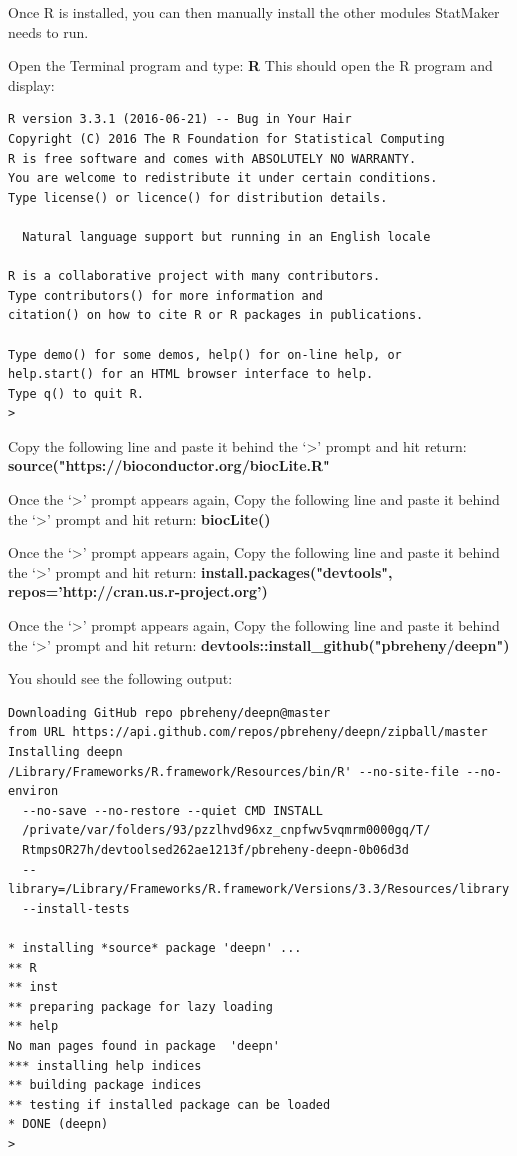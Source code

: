 \documentclass[11pt,fleqn]{book} %
\newcommand{\StatMaker}{{\color{Dandelion} StatMaker }}
\begin{document}
Once R is installed, you can then manually install the other modules \StatMaker needs to run.

Open the Terminal program and type:
 \textbf{R}
This should open the R program and display:


\begin{lstlisting}
R version 3.3.1 (2016-06-21) -- Bug in Your Hair
Copyright (C) 2016 The R Foundation for Statistical Computing
R is free software and comes with ABSOLUTELY NO WARRANTY.
You are welcome to redistribute it under certain conditions.
Type license() or licence() for distribution details.

  Natural language support but running in an English locale

R is a collaborative project with many contributors.
Type contributors() for more information and
citation() on how to cite R or R packages in publications.

Type demo() for some demos, help() for on-line help, or
help.start() for an HTML browser interface to help.
Type q() to quit R.
>
\end{lstlisting}

Copy the following line and paste it behind the ‘>’ prompt and hit return:\\
\textbf{source("https://bioconductor.org/biocLite.R"}

Once the ‘>’ prompt appears again, Copy the following line and paste it behind the ‘>’ prompt and hit return:
\textbf{biocLite()}

Once the ‘>’ prompt appears again, Copy the following line and paste it behind the ‘>’ prompt and hit return:
\textbf{install.packages("devtools", repos='http://cran.us.r-project.org')}

Once the ‘>’ prompt appears again, Copy the following line and paste it behind the ‘>’ prompt and hit return:
\textbf{devtools::install\_github("pbreheny/deepn")}


You should see the following output:
\begin{lstlisting}
Downloading GitHub repo pbreheny/deepn@master
from URL https://api.github.com/repos/pbreheny/deepn/zipball/master
Installing deepn
/Library/Frameworks/R.framework/Resources/bin/R' --no-site-file --no-environ  
  --no-save --no-restore --quiet CMD INSTALL  
  /private/var/folders/93/pzzlhvd96xz_cnpfwv5vqmrm0000gq/T/
  RtmpsOR27h/devtoolsed262ae1213f/pbreheny-deepn-0b06d3d  
  --library=/Library/Frameworks/R.framework/Versions/3.3/Resources/library  
  --install-tests 

* installing *source* package 'deepn' ...
** R
** inst
** preparing package for lazy loading
** help
No man pages found in package  'deepn' 
*** installing help indices
** building package indices
** testing if installed package can be loaded
* DONE (deepn)
> 
\end{lstlisting}
\end{document}
